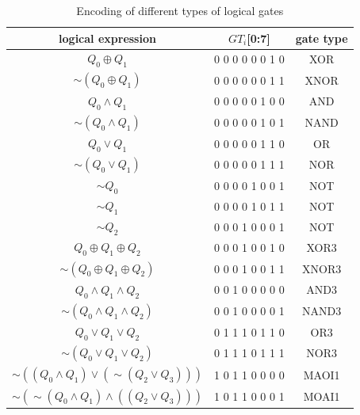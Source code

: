 \documentclass[final,5p,times,twocolumn]{elsarticle}
\begin{document}
\begin{table}[h]
    \caption{Encoding of different types of logical gates}\label{tab3}%
    \begin{tabular}{|c|c|c|}
        \hline
        logical expression                                   & $GT_i$[0:7]     & gate type \\
        \hline
        $Q_0 \oplus Q_1$                                     & 0 0 0 0 0 0 1 0 & XOR       \\
        $\sim (Q_0 \oplus Q_1)$                              & 0 0 0 0 0 0 1 1 & XNOR      \\
        $Q_0 \land Q_1$                                      & 0 0 0 0 0 1 0 0 & AND       \\
        $\sim (Q_0 \land Q_1)$                               & 0 0 0 0 0 1 0 1 & NAND      \\
        $Q_0 \lor Q_1$                                       & 0 0 0 0 0 1 1 0 & OR        \\
        $\sim (Q_0 \lor Q_1)$                                & 0 0 0 0 0 1 1 1 & NOR       \\
        $\sim Q_0$                                           & 0 0 0 0 1 0 0 1 & NOT       \\
        $\sim Q_1$                                           & 0 0 0 0 1 0 1 1 & NOT       \\
        $\sim Q_2$                                           & 0 0 0 1 0 0 0 1 & NOT       \\
        $Q_0 \oplus Q_1 \oplus Q_2$                          & 0 0 0 1 0 0 1 0 & XOR3      \\
        $\sim (Q_0 \oplus Q_1 \oplus Q_2)$                   & 0 0 0 1 0 0 1 1 & XNOR3     \\
        $Q_0 \land Q_1 \land Q_2$                            & 0 0 1 0 0 0 0 0 & AND3      \\
        $\sim (Q_0 \land Q_1 \land Q_2)$                     & 0 0 1 0 0 0 0 1 & NAND3     \\
        $Q_0 \lor Q_1 \lor Q_2$                              & 0 1 1 1 0 1 1 0 & OR3       \\
        $\sim (Q_0 \lor Q_1 \lor Q_2)$                       & 0 1 1 1 0 1 1 1 & NOR3      \\
        $\sim ((Q_0 \land Q_1) \lor (\sim (Q_2 \lor Q_3)))$  & 1 0 1 1 0 0 0 0 & MAOI1     \\
        $\sim (\sim (Q_0 \land Q_1) \land ((Q_2 \lor Q_3)))$ & 1 0 1 1 0 0 0 1 & MOAI1     \\
        \hline
    \end{tabular}
\end{table}
\end{document}

